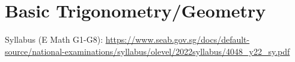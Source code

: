 \section{Basic Trigonometry/Geometry}
Syllabus (E Math G1-G8): \url{https://www.seab.gov.sg/docs/default-source/national-examinations/syllabus/olevel/2022syllabus/4048_y22_sy.pdf} \\[20pt]
